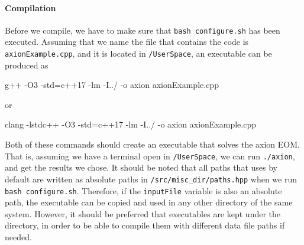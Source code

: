 \documentclass[11pt,a4paper]{article}
\begin{document}
\paragraph{Compilation}
%
Before we compile, we have to make sure that {\tt bash configure.sh} has been executed. Assuming that we name the file that contains the code is {\tt axionExample.cpp}, and it is located in {\tt \mimes/UserSpace}, an executable can be produced as
%
\begin{pseudo}
	g++ -O3 -std=c++17 -lm -I../ -o axion axionExample.cpp
\end{pseudo}
%
or 
%
\begin{pseudo}
	clang -lstdc++ -O3 -std=c++17 -lm -I../ -o axion axionExample.cpp
\end{pseudo}

Both of these commands should create an executable that solves the axion EOM. That is, assuming we have a terminal open in   {\tt \mimes/UserSpace}, we can run {\tt ./axion}, and get the results we chose. It should be noted that all paths that \mimes uses by default are written as absolute paths in {\tt \mimes/src/misc\_dir/paths.hpp} when we run {\tt bash configure.sh}. Therefore, if the {\tt inputFile} variable is also an absolute path, the executable can be copied and used in any other directory of the same system. However, it should be preferred that executables are kept under the \mimes directory, in order to be able to compile them with different data file paths if needed.
\end{document}
